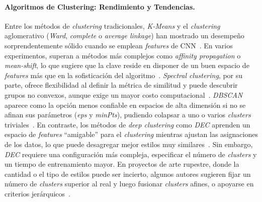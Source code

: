 \paragraph{Algoritmos de Clustering: Rendimiento y Tendencias.}
Entre los métodos de \textit{clustering} tradicionales, \textit{K-Means} y el \textit{clustering} aglomerativo (\textit{Ward}, \textit{complete} o \textit{average linkage}) han mostrado un desempeño sorprendentemente sólido cuando se emplean \textit{features} de CNN~\cite{gairola2020,guerin2018}.
En varios experimentos, superan a métodos más complejos como \textit{affinity propagation} o \textit{mean-shift}, lo que sugiere que la clave reside en disponer de un buen espacio de \textit{features} más que en la sofisticación del algoritmo~\cite{dangeti2024}.
\textit{Spectral clustering}, por su parte, ofrece flexibilidad al definir la métrica de similitud y puede descubrir grupos no convexos, aunque exige un mayor costo computacional~\cite{gultepe2018}.
\textit{DBSCAN} aparece como la opción menos confiable en espacios de alta dimensión si no se afinan sus parámetros (\textit{eps} y \textit{minPts}), pudiendo colapsar a uno o varios \textit{clusters} triviales~\cite{dangeti2024}.
En contraste, los métodos de \textit{deep clustering} como \textit{DEC} aprenden un espacio de \textit{features} “amigable” para el \textit{clustering} mientras ajustan las asignaciones de los datos, lo que puede desagregar mejor estilos muy similares~\cite{castellano2022}.
Sin embargo, \textit{DEC} requiere una configuración más compleja, especificar el número de \textit{clusters} y un tiempo de entrenamiento mayor.
En proyectos de arte rupestre, donde la cantidad o el tipo de estilos puede ser incierto, algunos autores sugieren fijar un número de \textit{clusters} superior al real y luego fusionar \textit{clusters} afines, o apoyarse en criterios jerárquicos~\cite{dangeti2024}.

